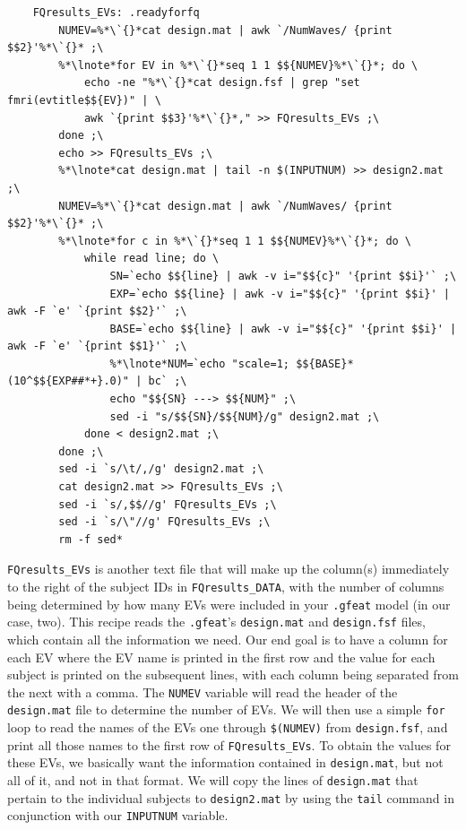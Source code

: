 \begin{lstlisting}
	FQresults_EVs: .readyforfq
		NUMEV=%*\`{}*cat design.mat | awk `/NumWaves/ {print $$2}'%*\`{}* ;\
		%*\lnote*for EV in %*\`{}*seq 1 1 $${NUMEV}%*\`{}*; do \
			echo -ne "%*\`{}*cat design.fsf | grep "set fmri(evtitle$${EV})" | \
			awk `{print $$3}'%*\`{}*," >> FQresults_EVs ;\
		done ;\
		echo >> FQresults_EVs ;\
		%*\lnote*cat design.mat | tail -n $(INPUTNUM) >> design2.mat ;\
		NUMEV=%*\`{}*cat design.mat | awk `/NumWaves/ {print $$2}'%*\`{}* ;\
		%*\lnote*for c in %*\`{}*seq 1 1 $${NUMEV}%*\`{}*; do \
		 	while read line; do \
				SN=`echo $${line} | awk -v i="$${c}" '{print $$i}'` ;\
				EXP=`echo $${line} | awk -v i="$${c}" '{print $$i}' | awk -F `e' `{print $$2}'` ;\
				BASE=`echo $${line} | awk -v i="$${c}" '{print $$i}' | awk -F `e' `{print $$1}'` ;\
				%*\lnote*NUM=`echo "scale=1; $${BASE}*(10^$${EXP##*+}.0)" | bc` ;\
				echo "$${SN} ---> $${NUM}" ;\	
				sed -i "s/$${SN}/$${NUM}/g" design2.mat ;\
			done < design2.mat ;\
		done ;\
		sed -i `s/\t/,/g' design2.mat ;\
		cat design2.mat >> FQresults_EVs ;\
		sed -i `s/,$$//g' FQresults_EVs ;\
		sed -i `s/\"//g' FQresults_EVs ;\
		rm -f sed*
\end{lstlisting}
\texttt{FQresults_EVs} is another text file that will make up the column(s) immediately to the right of the subject IDs in \texttt{FQresults_DATA}, with the number of columns being determined by how many EVs were included in your \texttt{.gfeat} model (in our case, two). This recipe reads the \texttt{.gfeat}'s \texttt{design.mat} and \texttt{design.fsf} files, which contain all the information we need. Our end goal is to have a column for each EV where the EV name is printed in the first row and the value for each subject is printed on the subsequent lines, with each column being separated from the next with a comma. The \texttt{NUMEV} variable will read the header of the \texttt{design.mat} file to determine the number of EVs.  We will then use a simple \texttt{for} loop to read the names of the EVs one through \texttt{\$(NUMEV)} from \texttt{design.fsf}, and print all those names to the first row of \texttt{FQresults_EVs}. To obtain the values for these EVs, we basically want the information contained in \texttt{design.mat}, but not all of it, and not in that format. We will copy the lines of \texttt{design.mat} that pertain to the individual subjects to \texttt{design2.mat} by using the \texttt{tail} command in conjunction with our \texttt{INPUTNUM} variable. 

